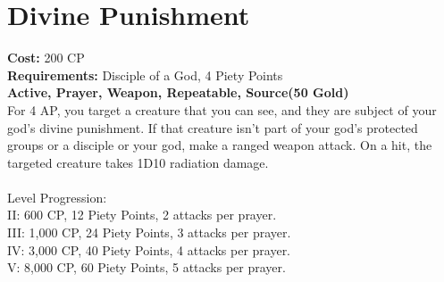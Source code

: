 \section{Divine Punishment}\label{prayer:divinePunishment}
\textbf{Cost:} 200 CP\\
\textbf{Requirements:} Disciple of a God, 4 Piety Points \\
\textbf{Active, Prayer, Weapon, Repeatable, Source(50 Gold)}\\
For 4 AP, you target a creature that you can see, and they are subject of your god's divine punishment.
If that creature isn't part of your god's protected groups or a disciple or your god, make a ranged weapon attack.
On a hit, the targeted creature takes 1D10 radiation damage.\\
\\
Level Progression:\\
II: 600 CP, 12 Piety Points, 2 attacks per prayer.\\
III: 1,000 CP, 24 Piety Points, 3 attacks per prayer.\\
IV: 3,000 CP, 40 Piety Points, 4 attacks per prayer.\\
V: 8,000 CP, 60 Piety Points, 5 attacks per prayer.\\